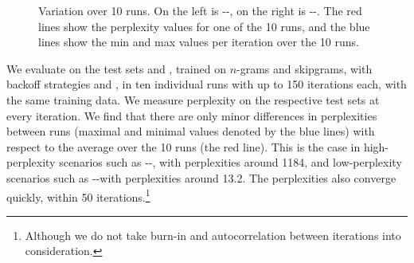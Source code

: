 \begin{figure*}
\caption{Variation over 10 runs. On the left is \jrc-\obw-\BOF, on the right is \jrc-\jrc-\BON. The red lines show the perplexity values for one of the 10 runs, and the blue lines show the min and max values per iteration over the 10 runs.}\label{fig:iterplots}
\end{figure*}


We evaluate on the test sets \jrc and \obw, trained on $n$-grams and skipgrams, with backoff strategies \BON and \BOF, in ten individual runs with up to 150 iterations each, with the same training data. We measure perplexity on the respective test sets at every iteration. We find that there are only minor differences in perplexities between runs (maximal and minimal values denoted by the blue lines) with respect to the average over the 10 runs (the red line). This is the case in high-perplexity scenarios such as \jrc-\obw-\BOF, with perplexities around 1184, and low-perplexity scenarios such as \jrc-\jrc-\BOF with perplexities around 13.2. The perplexities also converge quickly, within 50 iterations.\footnote{Although we do not take burn-in and autocorrelation between iterations into consideration.}


